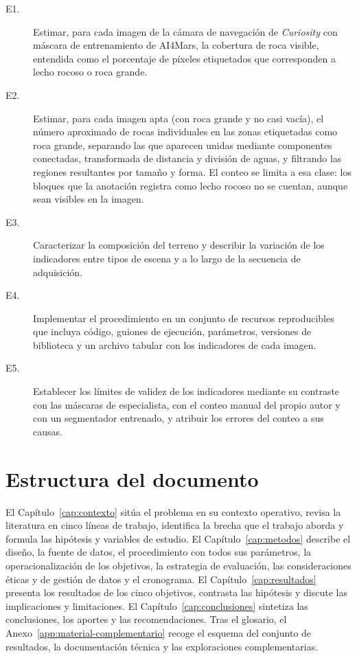 \begin{description}

  \item[E1.] Estimar, para cada imagen de la cámara de navegación de \textit{Curiosity} con
    máscara de entrenamiento de AI4Mars, la cobertura de roca visible,
    entendida como el porcentaje de píxeles etiquetados que corresponden a lecho rocoso o roca
    grande.

  \item[E2.] Estimar, para cada imagen apta (con roca grande y no casi vacía), el número
    aproximado de rocas
    individuales en las zonas
    etiquetadas como roca grande, separando las que aparecen unidas mediante componentes
    conectadas, transformada de distancia y división de aguas, y filtrando las regiones
    resultantes por tamaño y forma. El conteo se limita a esa clase: los bloques que la
    anotación registra como lecho rocoso no se cuentan, aunque sean visibles en la imagen.

  \item[E3.] Caracterizar la composición del terreno y describir la variación de los
    indicadores entre tipos de escena y a lo largo de la secuencia de adquisición.

  \item[E4.] Implementar el procedimiento en un conjunto de recursos reproducibles que incluya
    código, guiones de ejecución, parámetros, versiones de biblioteca y un archivo tabular con
    los indicadores de cada imagen.

  \item[E5.] Establecer los límites de validez de los indicadores mediante su contraste con
    las máscaras de especialista, con el conteo manual del propio autor y con un segmentador entrenado,
    y atribuir los errores del conteo a sus causas.

\end{description}

\section{Estructura del documento}

El Capítulo~\ref{cap:contexto} sitúa el problema en su contexto operativo, revisa la literatura
en cinco líneas de trabajo, identifica la brecha que el trabajo aborda y formula las hipótesis y
variables de estudio. El Capítulo~\ref{cap:metodos} describe el diseño, la fuente de datos, el
procedimiento con todos sus parámetros, la operacionalización de los objetivos, la estrategia
de evaluación, las consideraciones éticas y de gestión de datos y el cronograma. El Capítulo~\ref{cap:resultados} presenta los resultados de los
cinco objetivos, contrasta las hipótesis y discute las implicaciones y limitaciones. El
Capítulo~\ref{cap:conclusiones} sintetiza las conclusiones, los aportes y las recomendaciones.
Tras el glosario, el Anexo~\ref{app:material-complementario} recoge el esquema del conjunto de
resultados, la documentación técnica y las exploraciones complementarias.
